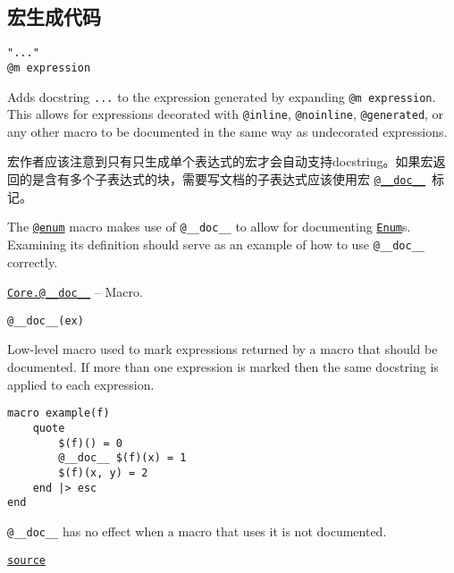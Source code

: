 \hypertarget{5068022185116881179}{}


\subsection{宏生成代码}




\begin{verbatim}
"..."
@m expression
\end{verbatim}



Adds docstring \texttt{{\textquotedbl}...{\textquotedbl}} to the expression generated by expanding \texttt{@m expression}. This allows for expressions decorated with \texttt{@inline}, \texttt{@noinline}, \texttt{@generated}, or any other macro to be documented in the same way as undecorated expressions.



宏作者应该注意到只有只生成单个表达式的宏才会自动支持docstring。如果宏返回的是含有多个子表达式的块，需要写文档的子表达式应该使用宏 \hyperlink{8194145670752069829}{\texttt{@\_\_doc\_\_}} 标记。



The \hyperlink{18177775477210803027}{\texttt{@enum}} macro makes use of \texttt{@\_\_doc\_\_} to allow for documenting \hyperlink{12477318268908279491}{\texttt{Enum}}s. Examining its definition should serve as an example of how to use \texttt{@\_\_doc\_\_} correctly.


\hypertarget{8194145670752069829}{} 
\hyperlink{8194145670752069829}{\texttt{Core.@\_\_doc\_\_}}  -- {Macro.}

\begin{adjustwidth}{2em}{0pt}


\begin{verbatim}
@__doc__(ex)
\end{verbatim}

Low-level macro used to mark expressions returned by a macro that should be documented. If more than one expression is marked then the same docstring is applied to each expression.


\begin{lstlisting}
macro example(f)
    quote
        $(f)() = 0
        @__doc__ $(f)(x) = 1
        $(f)(x, y) = 2
    end |> esc
end
\end{lstlisting}

\texttt{@\_\_doc\_\_} has no effect when a macro that uses it is not documented.



\href{https://github.com/JuliaLang/julia/blob/44fa15b1502a45eac76c9017af94332d4557b251/base/docs/Docs.jl#L428-L443}{\texttt{source}}


\end{adjustwidth}

